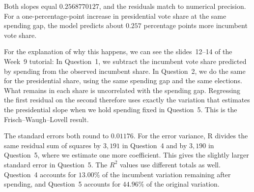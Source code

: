 \documentclass[12pt,letterpaper]{article}
\begin{document}
\begin{enumerate}[(1)]
Both slopes equal $0.2568770127$, and the residuals match to numerical precision. For a one-percentage-point increase in presidential vote share at the same spending gap, the model predicts about $0.257$ percentage points more incumbent vote share.

For the explanation of why this happens, we can see the slides~12--14 of the Week~9 tutorial:
 In Question~1, we subtract the incumbent vote share predicted by spending from the observed incumbent share. In Question~2, we do the same for the presidential share, using the same spending gap and the same elections. What remains in each share is uncorrelated with the spending gap. Regressing the first residual on the second therefore uses exactly the variation that estimates the presidential slope when we hold spending fixed in Question~5. This is the Frisch--Waugh--Lovell result.

The standard errors both round to $0.01176$. For the error variance, R divides the same residual sum of squares by $3{,}191$ in Question~4 and by $3{,}190$ in Question~5, where we estimate one more coefficient. This gives the slightly larger standard error in Question~5. The $R^2$ values use different totals as well. Question~4 accounts for $13.00\%$ of the incumbent variation remaining after spending, and Question~5 accounts for $44.96\%$ of the original variation.
\end{enumerate}
\end{document}
